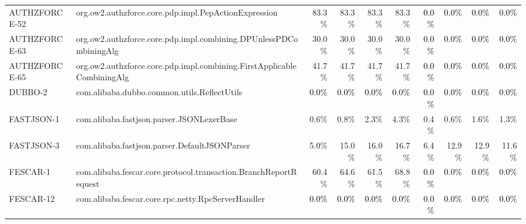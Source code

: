 \begin{tabular}{ ll rrrr rrrr}
AUTHZFORCE-52  &  org.ow2.authzforce.core.pdp.impl.PepActionExpression & 83.3\% & 83.3\% & 83.3\% & 83.3\% & \cellcolor{light-gray} \textcolor{black}{0.0\%} & \cellcolor{light-gray} \textcolor{black}{0.0\%} & \cellcolor{light-gray} \textcolor{black}{0.0\%} & \cellcolor{light-gray} \textcolor{black}{0.0\%}\\ 
AUTHZFORCE-63  &  org.ow2.authzforce.core.pdp.impl.combining.DPUnlessPDCombiningAlg & 30.0\% & 30.0\% & 30.0\% & 30.0\% & \cellcolor{light-gray} \textcolor{black}{0.0\%} & \cellcolor{light-gray} \textcolor{black}{0.0\%} & \cellcolor{light-gray} \textcolor{black}{0.0\%} & \cellcolor{light-gray} \textcolor{black}{0.0\%}\\ 
AUTHZFORCE-65  &  org.ow2.authzforce.core.pdp.impl.combining.FirstApplicableCombiningAlg & 41.7\% & 41.7\% & 41.7\% & 41.7\% & \cellcolor{light-gray} \textcolor{black}{0.0\%} & \cellcolor{light-gray} \textcolor{black}{0.0\%} & \cellcolor{light-gray} \textcolor{black}{0.0\%} & \cellcolor{light-gray} \textcolor{black}{0.0\%}\\ 
DUBBO-2  &  com.alibaba.dubbo.common.utils.ReflectUtils & \cellcolor{light-gray} \textcolor{black}{0.0\%} & \cellcolor{light-gray} \textcolor{black}{0.0\%} & \cellcolor{light-gray} \textcolor{black}{0.0\%} & \cellcolor{light-gray} \textcolor{black}{0.0\%} & \cellcolor{light-gray} \textcolor{black}{0.0\%} & \cellcolor{light-gray} \textcolor{black}{0.0\%} & \cellcolor{light-gray} \textcolor{black}{0.0\%} & \cellcolor{light-gray} \textcolor{black}{0.0\%}\\ 
FASTJSON-1  &  com.alibaba.fastjson.parser.JSONLexerBase & 0.6\% & 0.8\% & 2.3\% & 4.3\% & 0.4\% & 0.6\% & 1.6\% & 1.3\%\\ 
FASTJSON-3  &  com.alibaba.fastjson.parser.DefaultJSONParser & 5.0\% & 15.0\% & 16.0\% & 16.7\% & 6.4\% & 12.9\% & 12.9\% & 11.6\%\\ 
FESCAR-1  &  com.alibaba.fescar.core.protocol.transaction.BranchReportRequest & 60.4\% & 64.6\% & 61.5\% & 68.8\% & \cellcolor{light-gray} \textcolor{black}{0.0\%} & \cellcolor{light-gray} \textcolor{black}{0.0\%} & \cellcolor{light-gray} \textcolor{black}{0.0\%} & \cellcolor{light-gray} \textcolor{black}{0.0\%}\\ 
FESCAR-12  &  com.alibaba.fescar.core.rpc.netty.RpcServerHandler & \cellcolor{light-gray} \textcolor{black}{0.0\%} & \cellcolor{light-gray} \textcolor{black}{0.0\%} & \cellcolor{light-gray} \textcolor{black}{0.0\%} & \cellcolor{light-gray} \textcolor{black}{0.0\%} & \cellcolor{light-gray} \textcolor{black}{0.0\%} & \cellcolor{light-gray} \textcolor{black}{0.0\%} & \cellcolor{light-gray} \textcolor{black}{0.0\%} & \cellcolor{light-gray} \textcolor{black}{0.0\%}\\ 

\end{tabular}
